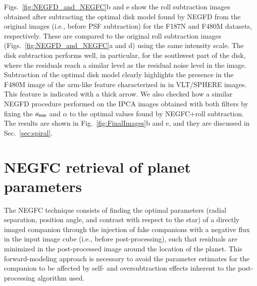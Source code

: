 \documentclass[longauth]{aa}
\begin{document}
\begin{appendix}
Figs.~\ref{fig:NEGFD_and_NEGFC}b and e show the roll subtraction images obtained after subtracting the optimal disk model found by NEGFD from the original images (i.e., before PSF subtraction) for the F187N and F480M datasets, respectively. These are compared to the original roll subtraction images (Figs.~\ref{fig:NEGFD_and_NEGFC}a and d) using the same intensity scale. The disk subtraction performs well, in particular, for the southwest part of the disk, where the residuals reach a similar level as the residual noise level in the image. Subtraction of the optimal disk model clearly highlights the presence in the F480M image of the arm-like feature characterized in \citet{Juillard2022} in VLT/SPHERE images. This feature is indicated with a thick arrow.
We also checked how a similar NEGFD procedure performed on the IPCA images obtained with both filters by fixing the $a_{\rm min}$ and $\alpha$ to the optimal values found by NEGFC+roll subtraction. The results are shown in Fig.~\ref{fig:FinalImages}b and e, and they are discussed in Sec.~\ref{sec:spiral}.


\section{NEGFC retrieval of planet parameters} \label{sec:NEGFC_optim}

The NEGFC technique consists of finding the optimal parameters (radial separation, position angle, and contrast with respect to the star) of a directly imaged companion through the injection of fake companions with a negative flux in the input image cube (i.e., before post-processing), such that residuals are minimized in the post-processed image around the location of the planet. This forward-modeling approach is necessary to avoid the parameter estimates for the companion to be affected by self- and oversubtraction effects inherent to the post-processing algorithm used.


\end{appendix}
\end{document}

